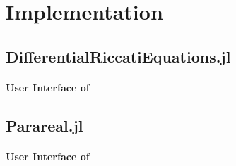 \section{Implementation}

\lstset{
  columns=fixed,
  style=julia,
  escapechar=\%,
}

\subsection{DifferentialRiccatiEquations.jl}
\begin{frame}[label=code_dre]{\secname}
\framesubtitle{User Interface of \subsecname}
\only<+>{}
\end{frame}

\subsection{Parareal.jl}
\begin{frame}[label=code_parareal]{\secname}
\framesubtitle{User Interface of \subsecname}
\only<+>{}
\only<+>{}
\only<+>{}
\end{frame}

\lstset{
  columns=flexible,
  style=remark
}

